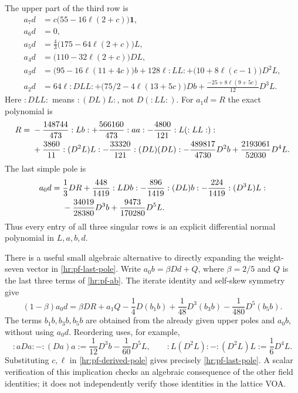 The upper part of the third row is
\begin{align*}
 a_7d&=c\bigl(55-16\ell(2+c)\bigr)\mathbf1,\\
 a_6d&=0,\\
 a_5d&=\frac43\bigl(175-64\ell(2+c)\bigr)L,\\
 a_4d&=\bigl(110-32\ell(2+c)\bigr)DL,\\
 a_3d&=\bigl(95-16\ell(11+4c)\bigr)b
          +128\ell:LL:+\bigl(10+8\ell(c-1)\bigr)D^2L,\\
 a_2d&=64\ell:DLL:
          +\bigl(75/2-4\ell(13+5c)\bigr)Db
          +\frac{-25+8\ell(9+5c)}{12}D^3L.
\end{align*}
Here $:DLL:$ means $:(DL)L:$, not $D(:LL:)$.
For $a_1d=R$ the exact polynomial is
\begin{align}
 R={}&-\frac{148744}{473}:Lb:
 +\frac{566160}{473}:aa:
 -\frac{4800}{121}:L(:LL:):\notag\\
 &+\frac{3860}{11}:(D^2L)L:
 -\frac{33320}{121}:(DL)(DL):
 -\frac{489817}{4730}D^2b
 +\frac{2193061}{52030}D^4L.
 \label{hr:pf-decoupling}
\end{align}
The last simple pole is
\begin{align}
 a_0d={}&\frac13DR+\frac{448}{1419}:LDb:
 -\frac{896}{1419}:(DL)b:
 -\frac{224}{1419}:(D^3L)L:\notag\\
 &-\frac{34019}{28380}D^3b
 +\frac{9473}{170280}D^5L.
 \label{hr:pf-last-pole}
\end{align}
Thus every entry of all three singular rows is an explicit
differential normal polynomial in $L,a,b,d$.

There is a useful small algebraic alternative to directly expanding
the weight-seven vector in \eqref{hr:pf-last-pole}. Write
$a_0b=\beta Dd+Q$, where $\beta=2/5$ and $Q$ is the last three
terms of \eqref{hr:pf-ab}. The iterate identity and self-skew symmetry give
\begin{equation}
 (1-\beta)a_0d=\beta DR+a_1Q
       -\frac14D(b_1b)+\frac1{48}D^3(b_3b)
       -\frac1{480}D^5(b_5b).
 \label{hr:pf-derived-pole}
\end{equation}
The terms $b_1b,b_3b,b_5b$ are obtained from the already given
upper poles and $a_0b$, without using $a_0d$. Reordering uses, for
example,
\[
 :aDa:-:(Da)a:=\frac1{12}D^3b-\frac1{60}D^5L,
 \qquad :L(D^2L):-:(D^2L)L:=\frac16D^4L.
\]
Substituting $c,\ell$ in \eqref{hr:pf-derived-pole} gives precisely
\eqref{hr:pf-last-pole}. A scalar verification of this implication
checks an algebraic consequence of the other field identities; it
does not independently verify those identities in the lattice VOA.

